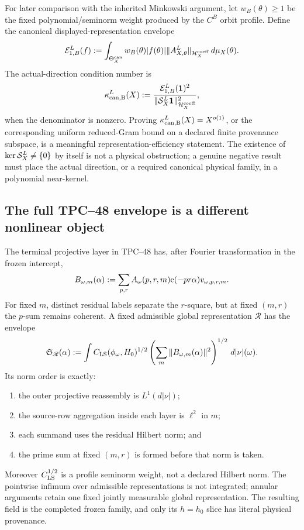 For later comparison with the inherited Minkowski argument, let
$w_B(\theta)\ge1$ be the fixed polynomial/seminorm weight produced by the
$C^B$ orbit profile.  Define the canonical displayed-representation envelope
\begin{equation}
 \mathcal E_{1,B}^L(f)
 :=\int_{\Theta_X^{\rm can}}
 w_B(\theta)|f(\theta)|
 \|A_{X,\theta}^L\|_{\mathcal H_X^{\rm coeff}}\,d\mu_X(\theta).
 \label{eq:tpc51-canonical-L1-envelope}
\end{equation}
The actual-direction condition number is
\begin{equation}
 \kappa_{\rm can,B}^L(X)
 :=\frac{\mathcal E_{1,B}^L(\mathbf 1)^2}
 {\|\mathcal S_X^L\mathbf 1\|_{\mathcal H_X^{\rm coeff}}^2},
 \label{eq:tpc51-actual-condition-number}
\end{equation}
when the denominator is nonzero.  Proving
$\kappa_{\rm can,B}^L(X)=X^{o(1)}$, or the corresponding uniform reduced-Gram
bound on a declared finite provenance subspace, is a meaningful
representation-efficiency statement.  The existence of
$\ker\mathcal S_X^L\ne\{0\}$ by itself is not a physical obstruction; a genuine
negative result must place the actual direction, or a required canonical
physical family, in a polynomial near-kernel.

\subsection{The full TPC--48 envelope is a different nonlinear object}

The terminal projective layer in TPC--48 has, after Fourier transformation
in the frozen intercept,
\begin{equation}
 B_{\omega,m}(\alpha)
 :=\sum_{p,r}A_\omega(p,r,m)\mathrm e(-pr\alpha)
 v_{\omega,p,r,m}.
 \label{eq:tpc51-inherited-row-vector}
\end{equation}
For fixed $m$, distinct residual labels separate the $r$-square, but at fixed
$(m,r)$ the $p$-sum remains coherent.  A fixed admissible global
representation $\mathscr R$ has the envelope
\begin{equation}
 \mathfrak S_{\mathscr R}(\alpha)
 :=\int
 C_{\rm LS}(\phi_\omega,H_0)^{1/2}
 \left(\sum_m\|B_{\omega,m}(\alpha)\|^2\right)^{1/2}
 \,d|\nu|(\omega).
 \label{eq:tpc51-full-profile-envelope}
\end{equation}
Its norm order is exactly:
\begin{enumerate}[label=\textup{(\roman*)},leftmargin=2.5em]
 \item the outer projective reassembly is $L^1(d|\nu|)$;
 \item the source-row aggregation inside each layer is $\ell^2$ in $m$;
 \item each summand uses the residual Hilbert norm; and
 \item the prime sum at fixed $(m,r)$ is formed before that norm is taken.
\end{enumerate}
Moreover $C_{\rm LS}^{1/2}$ is a profile seminorm weight, not a declared
Hilbert norm.  The pointwise infimum over admissible representations is not
integrated; annular arguments retain one fixed jointly measurable global
representation.  The resulting field is the completed frozen family, and
only its $h=h_0$ slice has literal physical provenance.

